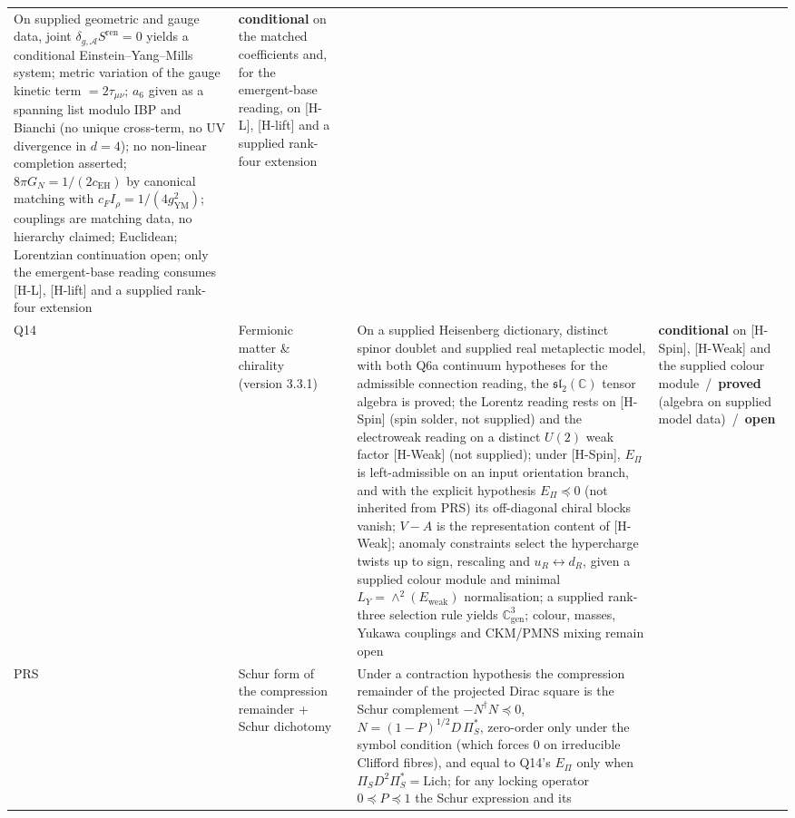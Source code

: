 \documentclass[11pt,a4paper]{article}
\newcommand{\sproved}{\textcolor{cproved}{\textbf{proved}}}
\newcommand{\sopen}{\textcolor{copen}{\textbf{open}}}
\newcommand{\scond}{\textcolor{ccond}{\textbf{conditional}}}
\begin{document}
\begin{longtable}{@{}p{1.70cm}p{2.9cm}p{1.3cm}p{6.25cm}>{\raggedright\arraybackslash}p{2.0cm}@{}}
      On supplied geometric and gauge data, joint $\delta_{g,\mathcal{A}} S^{\mathrm{ren}} = 0$ yields a conditional
      Einstein--Yang--Mills system; metric variation of the gauge kinetic term $= 2\tau_{\mu\nu}$;
      $a_6$ given as a spanning list modulo IBP and Bianchi (no unique cross-term, no UV
      divergence in $d=4$); no non-linear completion asserted;
      $8\pi G_N = 1/(2c_{\mathrm{EH}})$ by canonical matching with
      $c_F I_\rho = 1/(4g_{\mathrm{YM}}^2)$; couplings are matching data, no hierarchy claimed;
      Euclidean; Lorentzian continuation open; only the emergent-base reading consumes [H-L], [H-lift] and a supplied
      rank-four extension &
      \scond{} on the matched coefficients and, for the emergent-base reading, on [H-L], [H-lift] and a supplied
      rank-four extension \\[3pt]
      Q14 & Fermionic matter \& chirality (version 3.3.1) & \cite{Beau2026q14} &
      On a supplied Heisenberg dictionary, distinct spinor doublet and supplied real metaplectic model,
      with both Q6a continuum hypotheses for the admissible connection reading, the
      $\mathfrak{sl}_2(\mathbb{C})$ tensor algebra is proved; the Lorentz reading rests on [H-Spin] (spin
      solder, not supplied) and the electroweak reading on a distinct $U(2)$ weak factor [H-Weak] (not
      supplied); under [H-Spin], $E_\Pi$ is left-admissible on an input orientation branch, and with the explicit
      hypothesis $E_\Pi \preceq 0$ (not inherited from PRS) its off-diagonal chiral blocks vanish; $V{-}A$
      is the representation content of [H-Weak]; anomaly constraints select the hypercharge twists up to
      sign, rescaling and $u_R \leftrightarrow d_R$, given a supplied colour module and minimal
      $L_Y = \wedge^2(E_{\mathrm{weak}})$ normalisation; a supplied rank-three selection rule yields
      $\mathbb{C}^3_{\mathrm{gen}}$; colour, masses, Yukawa couplings and CKM/PMNS mixing remain open &
      \scond{} on [H-Spin], [H-Weak] and the supplied colour module\ /\ \sproved{} (algebra on supplied model
      data)\ /\ \sopen \\[3pt]
      PRS & Schur form of the compression remainder + Schur dichotomy & \cite{Beau2026prs} &
      Under a contraction hypothesis the compression remainder of the projected Dirac square is the Schur
      complement $-N^\dagger N \preceq 0$, $N = (1-P)^{1/2} D\,\Pi_S^*$, zero-order only under the symbol condition
      (which forces $0$ on irreducible Clifford fibres), and equal to Q14's $E_\Pi$ only when
      $\Pi_S D^2 \Pi_S^* = \mathrm{Lich}$; for any locking operator $0 \preceq P \preceq 1$ the Schur expression and its

\end{longtable}
\end{document}
